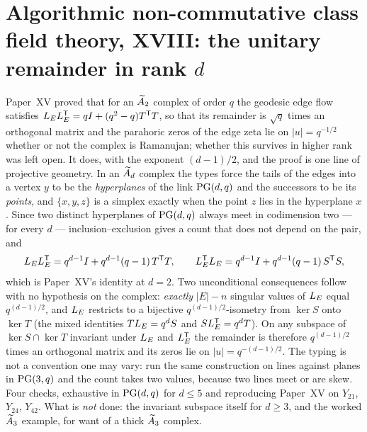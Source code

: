 \chapter[\texorpdfstring{XVIII. The unitary remainder in rank $d$}{XVIII. The unitary remainder in rank d}]{\texorpdfstring{Algorithmic non-commutative class field theory, XVIII: the unitary remainder in rank $d$}{Algorithmic non-commutative class field theory, XVIII: the unitary remainder in rank d}}\label{chap:XVIII}
\begin{chapterabstract}
Paper~XV proved that for an $\widetilde A_{2}$ complex of order $q$ the geodesic edge flow
satisfies $L_EL_E^{\mathsf T}=qI+(q^2-q)T^{\mathsf T}T$, so that its remainder is
$\sqrt q$ times an orthogonal matrix and the parahoric zeros of the edge zeta lie on
$|u|=q^{-1/2}$ whether or not the complex is Ramanujan; whether this survives in higher
rank was left open. It does, with the exponent $(d-1)/2$, and the proof is one line of
projective geometry. In an $\widetilde A_{d}$ complex the types force the tails of the edges into
a vertex $y$ to be the \emph{hyperplanes} of the link $\mathrm{PG}(d,q)$ and the successors to be
its \emph{points}, and $\{x,y,z\}$ is a simplex exactly when the point $z$ lies in the
hyperplane $x$. Since two distinct hyperplanes of $\mathrm{PG}(d,q)$ always meet in codimension
two --- for every $d$ --- inclusion--exclusion gives a count that does not depend on the
pair, and
\[
L_EL_E^{\mathsf T}=q^{d-1}I+q^{d-1}(q-1)\,T^{\mathsf T}T,\qquad
L_E^{\mathsf T}L_E=q^{d-1}I+q^{d-1}(q-1)\,S^{\mathsf T}S,
\]
which is Paper~XV's identity at $d=2$. Two unconditional consequences follow with no
hypothesis on the complex: \emph{exactly} $|E|-n$ singular values of $L_E$ equal
$q^{(d-1)/2}$, and $L_E$ restricts to a bijective $q^{(d-1)/2}$-isometry from $\ker S$ onto
$\ker T$ (the mixed identities $TL_E=q^{d}S$ and $SL_E^{\mathsf T}=q^{d}T$). On any
subspace of $\ker S\cap\ker T$ invariant under $L_E$ and $L_E^{\mathsf T}$ the remainder
is therefore $q^{(d-1)/2}$ times an orthogonal matrix and its zeros lie on
$|u|=q^{-(d-1)/2}$. The typing is not a convention one may vary: run the same construction
on lines against planes in $\mathrm{PG}(3,q)$ and the count takes two values, because two lines
meet or are skew. Four checks, exhaustive in $\mathrm{PG}(d,q)$ for $d\le5$ and reproducing
Paper~XV on $Y_{21}$, $Y_{24}$, $Y_{42}$. What is \emph{not} done: the invariant subspace
itself for $d\ge3$, and the worked $\widetilde A_{3}$ example, for want of a thick $\widetilde A_{3}$
complex.
\end{chapterabstract}

